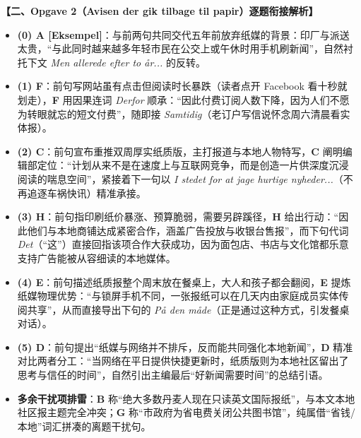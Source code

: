 \begin{answerbox}
\textbf{\color{NCDNavy}【二、Opgave 2（Avisen der gik tilbage til papir）逐题衔接解析】}
\begin{itemize}
  \item \textbf{(0) A [Eksempel]}：与前两句共同交代五年前放弃纸媒的背景：印厂与派送太贵，“与此同时越来越多年轻市民在公交上或午休时用手机刷新闻”，自然衬托下文 \textit{Men allerede efter to år...} 的反转。
  \item \textbf{(1) F}：前句写网站虽有点击但阅读时长暴跌（读者点开 Facebook 看十秒就划走），\textbf{F} 用因果连词 \textit{Derfor} 顺承：“因此付费订阅人数下降，因为人们不愿为转眼就忘的短文付费”，随即接 \textit{Samtidig}（老订户写信说怀念周六清晨看实体报）。
  \item \textbf{(2) C}：前句宣布重推双周厚实纸质版，主打报道与本地人物特写，\textbf{C} 阐明编辑部定位：“计划从来不是在速度上与互联网竞争，而是创造一片供深度沉浸阅读的喘息空间”，紧接着下一句以 \textit{I stedet for at jage hurtige nyheder...}（不再追逐车祸快讯）精准承接。
  \item \textbf{(3) H}：前句指印刷纸价暴涨、预算脆弱，需要另辟蹊径，\textbf{H} 给出行动：“因此他们与本地商铺达成紧密合作，涵盖广告投放与收银台售报”，而下句代词 \textit{Det}（“这”）直接回指该项合作大获成功，因为面包店、书店与文化馆都乐意支持广告能被从容细读的本地媒体。
  \item \textbf{(4) E}：前句描述纸质报整个周末放在餐桌上，大人和孩子都会翻阅，\textbf{E} 提炼纸媒物理优势：“与锁屏手机不同，一张报纸可以在几天内由家庭成员实体传阅共享”，从而直接导出下句的 \textit{På den måde}（正是通过这种方式，引发餐桌对话）。
  \item \textbf{(5) D}：前句提出“纸媒与网络并不排斥，反而能共同强化本地新闻”，\textbf{D} 精准对比两者分工：“当网络在平日提供快捷更新时，纸质版则为本地社区留出了思考与信任的时间”，自然引出主编最后“好新闻需要时间”的总结引语。
  \item \textbf{多余干扰项排雷}：\textbf{B} 称“绝大多数丹麦人现在只读英文国际报纸”，与本文本地社区报主题完全冲突；\textbf{G} 称“市政府为省电费关闭公共图书馆”，纯属借“省钱/本地”词汇拼凑的离题干扰句。
\end{itemize}
\end{answerbox}

